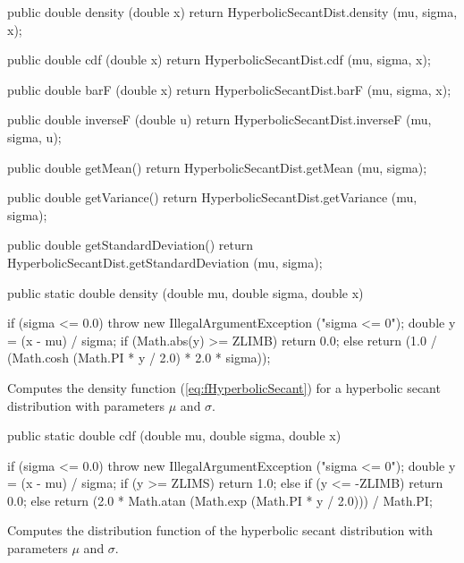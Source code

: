 \begin{code}\begin{hide}

   public double density (double x) {
      return HyperbolicSecantDist.density (mu, sigma, x);
   }

   public double cdf (double x) {
      return HyperbolicSecantDist.cdf (mu, sigma, x);
   }

   public double barF (double x) {
      return HyperbolicSecantDist.barF (mu, sigma, x);
   }

   public double inverseF (double u) {
      return HyperbolicSecantDist.inverseF (mu, sigma, u);
   }

   public double getMean() {
      return HyperbolicSecantDist.getMean (mu, sigma);
   }

   public double getVariance() {
      return HyperbolicSecantDist.getVariance (mu, sigma);
   }

   public double getStandardDeviation() {
      return HyperbolicSecantDist.getStandardDeviation (mu, sigma);
   }\end{hide}

   public static double density (double mu, double sigma, double x)\begin{hide} {
      if (sigma <= 0.0)
         throw new IllegalArgumentException ("sigma <= 0");
      double y = (x - mu) / sigma;
      if (Math.abs(y) >= ZLIMB)
         return 0.0;
      else
         return (1.0 / (Math.cosh (Math.PI * y / 2.0) * 2.0 * sigma));
   }\end{hide}
\end{code}
\begin{tabb} Computes the density function (\ref{eq:fHyperbolicSecant})
  for a hyperbolic secant distribution with parameters $\mu$ and $\sigma$.
\end{tabb}
\begin{code}

   public static double cdf (double mu, double sigma, double x)\begin{hide} {
      if (sigma <= 0.0)
         throw new IllegalArgumentException ("sigma <= 0");
      double y = (x - mu) / sigma;
      if (y >= ZLIMS)
         return 1.0;
      else if (y <= -ZLIMB)
      	 return 0.0;
      else
         return (2.0 * Math.atan (Math.exp (Math.PI * y / 2.0))) / Math.PI;
   }\end{hide}
\end{code}
\begin{tabb}
   Computes the distribution function of the hyperbolic secant distribution
   with parameters $\mu$ and $\sigma$.
 \end{tabb}
